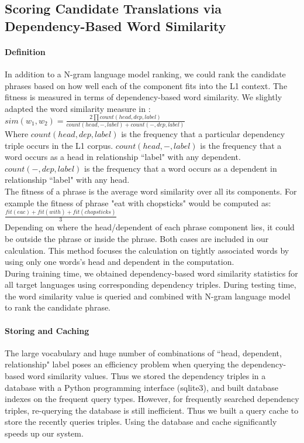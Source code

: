 \documentclass[11pt]{article}
\begin{document}

\subsection{Scoring Candidate Translations via Dependency-Based Word Similarity}
\label{sec:dependencySIM}

\paragraph{Definition} In addition to a N-gram language model ranking, we could rank the candidate phrases based on how well each of the component fits into the L1 context. The fitness is measured in terms of dependency-based word similarity. We slightly adapted the word similarity measure in \cite{lin:98}:\\
$ sim(w_1,w_2) = \frac{2 \prod count(head,dep,label)} 
{count(head,-,label) + count(-,dep,label)}$\\

Where $count(head,dep,label)$ is the frequency that a particular dependency triple occurs in the L1 corpus. $count(head,-,label)$ is the frequency that a word occurs as a head in relationship ``label" with any dependent. $count(-,dep,label)$ is the frequency that a word occurs as a dependent in relationship ``label" with any head. \\
The fitness of a phrase is the average word similarity over all its components. For example the fitness of phrase "eat with chopsticks" would be computed as:\\
$ \frac{fit(eac) + fit(with) + fit(chopsticks) } {3} $\\
Depending on where the head/dependent of each phrase component lies, it could be outside the phrase or inside the phrase. Both cases are included in our calculation. 
This method focuses the calculation on tightly associated words by using only one words's head and dependent in the computation.\\ 
During training time, we obtained dependency-based word similarity statistics for all target languages using corresponding dependency triples. During testing time, the word similarity value is queried and combined with N-gram language model to rank the candidate phrase. \\

\paragraph{Storing and Caching}
The large vocabulary and huge number of combinations of ``head, dependent, relationship" label poses an efficiency problem when querying the dependency-based word similarity values. Thus we stored the dependency triples in a database with a Python programming interface (sqlite3), and built database indexes on the frequent query types. However, for frequently searched dependency triples, re-querying the database is still inefficient. Thus we built a query cache to store the recently queries triples. Using the database and cache significantly speeds up our system. \\
\end{document}
